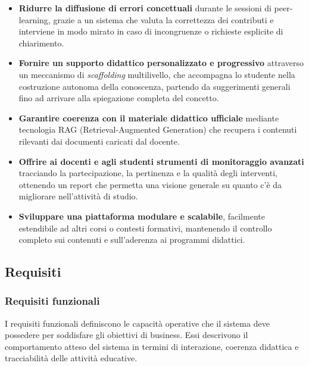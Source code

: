 \documentclass[a4paper,9pt]{article}
\begin{document}
	\begin{itemize} 
		\item \textbf{Ridurre la diffusione di errori concettuali} durante le sessioni di peer-learning, grazie a un sistema che valuta la correttezza dei contributi e interviene in modo mirato in caso di incongruenze o richieste esplicite di chiarimento.
		
		\item \textbf{Fornire un supporto didattico personalizzato e progressivo} attraverso un meccanismo di \emph{scaffolding} multilivello, che accompagna lo studente nella costruzione autonoma della conoscenza, partendo da suggerimenti generali fino ad arrivare alla spiegazione completa del concetto.
		
		 \item \textbf{Garantire coerenza con il materiale didattico ufficiale} mediante tecnologia RAG  (Retrieval-Augmented Generation) che recupera i contenuti rilevanti dai documenti caricati dal docente.
			 
		 \item \textbf{Offrire ai docenti e agli studenti strumenti di monitoraggio avanzati} tracciando la partecipazione, la pertinenza e la qualità degli interventi, ottenendo un report che permetta una visione generale su quanto c'è da migliorare nell'attività di studio.
			
		 \item \textbf{Sviluppare una piattaforma modulare e scalabile}, facilmente estendibile ad altri corsi o contesti formativi, mantenendo il controllo completo sui contenuti e sull’aderenza ai programmi didattici.
		 
	\end{itemize}
	
	\subsection{Requisiti}
	\subsubsection{Requisiti funzionali}
	
	I requisiti funzionali definiscono le capacità operative che il sistema deve possedere per soddisfare gli obiettivi di business. Essi descrivono il comportamento atteso del sistema in termini di interazione, coerenza didattica e tracciabilità delle attività educative.
	
\end{document}
